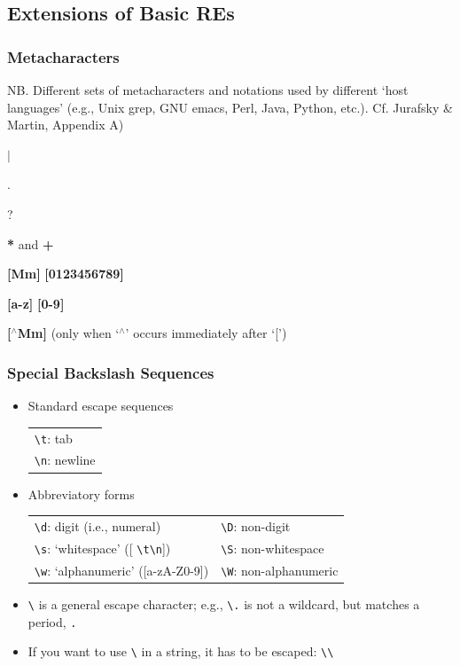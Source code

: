 \subsection{Extensions of Basic REs}

\begin{frame}[fragile]
  \frametitle{Metacharacters}

NB. Different sets of metacharacters and notations used by different `host languages' (e.g., Unix
grep, GNU emacs, Perl, Java, Python,  etc.). Cf. Jurafsky \& Martin, Appendix A)

\begin{description}[<+->]
  \item [Disjunction:] \textbf{$\mid$}
  \item [Wild card:] \textbf{}.
  \item [Optionality:] \textbf{}?
  \item [Quantification:] \textbf{*} and \textbf{+}
  \item [Choice:] \textbf{[Mm]} \textbf{[0123456789]}
  \item [Ranges:] \textbf{[a-z]} \textbf{[0-9]}
  \item [Negation:] \textbf{[$^\wedge$Mm]} (only when `$^\wedge$' occurs immediately
    after `[')

\end{description}
\end{frame}
\begin{frame}[fragile]
  \frametitle{Special Backslash Sequences}

  \begin{itemize}[<+->]
  \item Standard escape sequences\\
  \begin{tabular}{l}
\verb!\t!: tab \\
\verb!\n!: newline \\
  \end{tabular}

  \item Abbreviatory forms\\
  \begin{tabular}{ll}
\verb!\d!: digit (i.e., numeral) & \verb!\D!: non-digit \\
\verb!\s!: `whitespace' ([ \verb!\t\n!]) & \verb!\S!: non-whitespace \\
\verb!\w!: `alphanumeric' ([a-zA-Z0-9]) & \verb!\W!: non-alphanumeric \\
  \end{tabular}

   \item \verb!\! is a general escape character; e.g., \verb!\.! is
         not a wildcard, but
         matches a period, \verb!.!
   \item If you want to use \verb!\! in a string, it has to be
         escaped: \verb!\\!

  \end{itemize}





\end{frame}

